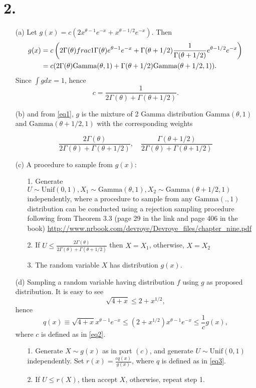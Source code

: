 \documentclass{article}\usepackage[]{graphicx}\usepackage[]{color}
\begin{document}
\section*{2.}
\begin{itemize}
\item[(a)] Let $g(x) = c(2x^{\theta -1} e^{-x} + x^{\theta - 1/2} e^{-x})$. Then 
\begin{align}
g(x) & = c\left(2\Gamma(\theta) frac{1}{\Gamma(\theta)}e^{\theta - 1} e^{-x} + \Gamma(\theta + 1/2) \frac{1}{\Gamma(\theta + 1/2)} e^{\theta -1/2}e^{-x}  \right)\notag\\
     & = c(2\Gamma(\theta) \mbox{Gamma}(\theta, 1) + \Gamma(\theta +1/2) \mbox{Gamma}(\theta +1/2, 1)). \label{eq1}
\end{align} 
Since $\int  g dx = 1$, hence 
\begin{equation}\label{eq2}
c = \frac{1}{2\Gamma(\theta) + \Gamma(\theta + 1/2)}.
\end{equation}
\item[(b)] and from \eqref{eq1}, $g$ is the mixture of 2 Gamma distribution  $\mbox{Gamma}(\theta, 1)$ and $\mbox{Gamma}(\theta +1/2, 1)$ with the corresponding weights 

\[
\frac{2\Gamma(\theta)}{2\Gamma(\theta) + \Gamma(\theta + 1/2)}, \quad \frac{\Gamma(\theta+1/2)}{2\Gamma(\theta) + \Gamma(\theta + 1/2)}
\]

\item[(c)] A procedure to sample from $g(x)$: 
\begin{itemize}
\item[1.] Generate $U \sim \mbox{Unif}(0,1), X_1 \sim \mbox{Gamma}(\theta, 1), X_2 \sim \mbox{Gamma}(\theta+1/2, 1)$ independently, where a procedure to sample from any $\mbox{Gamma}(., 1)$ distribution can be conducted using a rejection sampling procedure following from Theorem 3.3 (page 29 in the link and page 406 in the  book) \href{http://www.nrbook.com/devroye/Devroye_files/chapter_nine.pdf}{http://www.nrbook.com/devroye/Devroye\_files/chapter\_nine.pdf}    
\item[2.] If $U \leq \frac{2\Gamma(\theta)}{2\Gamma(\theta) + \Gamma(\theta + 1/2)}$ then $X = X_1$, otherwise, $X = X_2$
\item[3.]  The random variable $X$ has distribution $g(x)$.
\end{itemize}

\item [(d)] Sampling a random variable having distribution $f$ using $g$ as proposed distribution. 
It is easy to see 
\[
\sqrt{4+ x} \leq 2 + x^{1/2},
\]
hence
\begin{equation}\label{eq3}
q(x) \equiv \sqrt{4+x} x^{\theta -1} e^{-x} \leq (2+ x^{1/2}) x^{\theta-1} e^{-x }
\leq \frac{1}{c} g(x),
\end{equation}
where $c$ is defined as in \eqref{eq2}.
\begin{itemize}
\item[1.] Generate $X \sim g(x)$ as in part $(c)$, and generate $U \sim \mbox{Unif}(0,1)$ independently. Set $r(x) = \frac{c q(x)}{g(x)}$, where $q$ is defined as in \eqref{eq3}. 
\item[2.] If $U \leq r(X)$, then accept $X$, otherwise, repeat step 1.
\end{itemize} 
\end{itemize}
\end{document}
